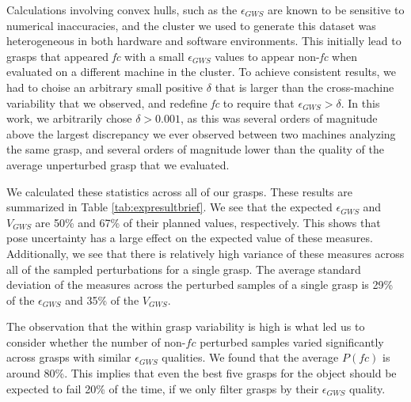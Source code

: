 Calculations involving convex hulls, such as the $\epsilon_{GWS}$ are known to be sensitive to numerical inaccuracies, and the cluster we used to generate this dataset was heterogeneous in both hardware and software environments. This initially lead to grasps that appeared \emph{fc}  with a small $\epsilon_{GWS}$ values to appear non-\emph{fc} when evaluated on a different machine in the cluster. To achieve consistent results, we had to choise an arbitrary small positive $\delta$ that is larger than the cross-machine variability that we observed, and redefine \emph{fc} to require that  $\epsilon_{GWS} > \delta$. In this work, we arbitrarily chose $\delta > 0.001$, as this was several orders of magnitude above the largest discrepancy we ever observed between two machines analyzing the same grasp, and several orders of magnitude lower than the quality of the average unperturbed grasp that we evaluated. 

We calculated these statistics across all of our grasps. These results are summarized in Table \ref{tab:expresultbrief}. We see that the expected $\epsilon_{GWS}$ and $V_{GWS}$ are 50\% and 67\% of their planned values, respectively.  This shows that pose uncertainty has a large effect on the expected value of these measures.  Additionally, we see that there is relatively high variance of these measures across all of the sampled perturbations for a single grasp. The average standard deviation of the measures across the perturbed samples of a single grasp is 29\% of the $\epsilon_{GWS}$ and 35\% of the $V_{GWS}$. 

The observation that the within grasp variability is high is what led us to consider whether the number of non-$fc$ perturbed samples varied significantly across grasps with similar $\epsilon_{GWS}$ qualities. We found that the average $P(fc)$ is around 80\%. This implies that even the best five grasps for the object should be expected to fail 20\% of the time, if we only filter grasps by their $\epsilon_{GWS}$  quality.


